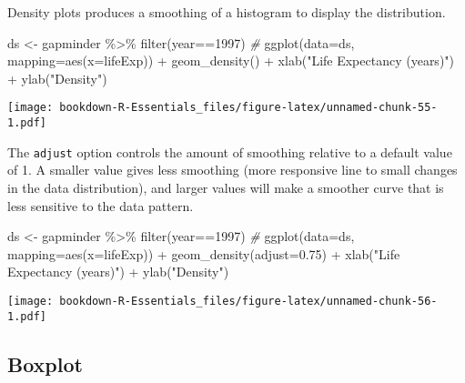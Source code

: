 \documentclass[
]{book}
\newenvironment{Shaded}{\begin{snugshade}}{\end{snugshade}}
\newcommand{\AttributeTok}[1]{\textcolor[rgb]{0.77,0.63,0.00}{#1}}
\newcommand{\CommentTok}[1]{\textcolor[rgb]{0.56,0.35,0.01}{\textit{#1}}}
\newcommand{\DecValTok}[1]{\textcolor[rgb]{0.00,0.00,0.81}{#1}}
\newcommand{\FloatTok}[1]{\textcolor[rgb]{0.00,0.00,0.81}{#1}}
\newcommand{\FunctionTok}[1]{\textcolor[rgb]{0.00,0.00,0.00}{#1}}
\newcommand{\NormalTok}[1]{#1}
\newcommand{\OtherTok}[1]{\textcolor[rgb]{0.56,0.35,0.01}{#1}}
\newcommand{\SpecialCharTok}[1]{\textcolor[rgb]{0.00,0.00,0.00}{#1}}
\newcommand{\StringTok}[1]{\textcolor[rgb]{0.31,0.60,0.02}{#1}}
\begin{document}
Density plots produces a smoothing of a histogram to display the distribution.

\begin{Shaded}
\begin{Highlighting}[]
\NormalTok{ds }\OtherTok{\textless{}{-}}\NormalTok{ gapminder }\SpecialCharTok{\%\textgreater{}\%} \FunctionTok{filter}\NormalTok{(year}\SpecialCharTok{==}\DecValTok{1997}\NormalTok{)}
\CommentTok{\#}
\FunctionTok{ggplot}\NormalTok{(}\AttributeTok{data=}\NormalTok{ds, }\AttributeTok{mapping=}\FunctionTok{aes}\NormalTok{(}\AttributeTok{x=}\NormalTok{lifeExp)) }\SpecialCharTok{+} 
  \FunctionTok{geom\_density}\NormalTok{() }\SpecialCharTok{+} 
  \FunctionTok{xlab}\NormalTok{(}\StringTok{"Life Expectancy (years)"}\NormalTok{) }\SpecialCharTok{+}
  \FunctionTok{ylab}\NormalTok{(}\StringTok{"Density"}\NormalTok{)}
\end{Highlighting}
\end{Shaded}

\texttt{[image: bookdown-R-Essentials\_files/figure-latex/unnamed-chunk-55-1.pdf]}

The \texttt{adjust} option controls the amount of smoothing relative to a default value of 1. A smaller value gives less smoothing (more responsive line to small changes in the data distribution), and larger values will make a smoother curve that is less sensitive to the data pattern.

\begin{Shaded}
\begin{Highlighting}[]
\NormalTok{ds }\OtherTok{\textless{}{-}}\NormalTok{ gapminder }\SpecialCharTok{\%\textgreater{}\%} \FunctionTok{filter}\NormalTok{(year}\SpecialCharTok{==}\DecValTok{1997}\NormalTok{)}
\CommentTok{\#}
\FunctionTok{ggplot}\NormalTok{(}\AttributeTok{data=}\NormalTok{ds, }\AttributeTok{mapping=}\FunctionTok{aes}\NormalTok{(}\AttributeTok{x=}\NormalTok{lifeExp)) }\SpecialCharTok{+} 
  \FunctionTok{geom\_density}\NormalTok{(}\AttributeTok{adjust=}\FloatTok{0.75}\NormalTok{) }\SpecialCharTok{+} 
  \FunctionTok{xlab}\NormalTok{(}\StringTok{"Life Expectancy (years)"}\NormalTok{) }\SpecialCharTok{+}
  \FunctionTok{ylab}\NormalTok{(}\StringTok{"Density"}\NormalTok{)}
\end{Highlighting}
\end{Shaded}

\texttt{[image: bookdown-R-Essentials\_files/figure-latex/unnamed-chunk-56-1.pdf]}

\hypertarget{boxplot}{%
\subsection{Boxplot}\label{boxplot}}
\end{document}
